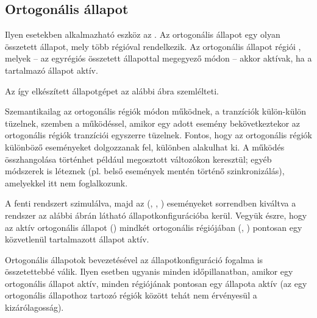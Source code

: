 \subsection{Ortogonális állapot}

Ilyen esetekben alkalmazható eszköz az . Az ortogonális állapot egy olyan összetett állapot, mely több régióval rendelkezik. Az ortogonális állapot régiói , melyek -- az egyrégiós összetett állapottal megegyező módon -- akkor aktívak, ha a tartalmazó állapot aktív.

Az így elkészített állapotgépet az alábbi ábra szemlélteti.

\begin{fektetett}
\end{fektetett}

Szemantikailag az ortogonális régiók  módon működnek, a tranzíciók külön-külön tüzelnek, szemben a  működéssel, amikor egy adott esemény bekövetkeztekor az ortogonális régiók tranzíciói egyszerre tüzelnek. Fontos, hogy az ortogonális régiók különböző eseményeket dolgozzanak fel, különben  alakulhat ki. A működés összhangolása történhet például megosztott változókon keresztül; egyéb módszerek is léteznek (pl. belső események mentén történő szinkronizálás), amelyekkel itt nem foglalkozunk.

\begin{megjegyzes}
	A fenti rendszert szimulálva, majd az (, , ) eseményeket sorrendben kiváltva a rendszer az alábbi ábrán látható állapotkonfigurációba kerül. Vegyük észre, hogy az aktív ortogonális állapot () mindkét ortogonális régiójában (, ) pontosan egy közvetlenül tartalmazott állapot aktív.

\end{megjegyzes}

Ortogonális állapotok bevezetésével az állapotkonfiguráció fogalma is összetettebbé válik. Ilyen esetben ugyanis minden időpillanatban, amikor egy ortogonális állapot aktív, minden régiójának pontosan egy állapota aktív (az egy ortogonális állapothoz tartozó régiók között tehát nem érvényesül a kizárólagosság).

